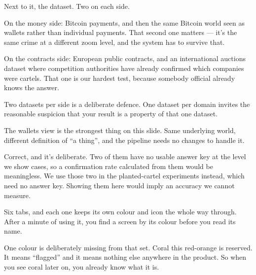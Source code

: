 \documentclass[11pt]{article}
\begin{document}

\begin{saythis}
Next to it, the dataset. Two on each side.

On the money side: Bitcoin payments, and then the same Bitcoin world seen as
wallets rather than individual payments. That second one matters --- it's the
same crime at a different zoom level, and the system has to survive that.

On the contracts side: European public contracts, and an international auctions
dataset where competition authorities have already confirmed which companies
were cartels. That one is our hardest test, because somebody official already
knows the answer.
\end{saythis}

\begin{means}
Two datasets per side is a deliberate defence. One dataset per domain invites
the reasonable suspicion that your result is a property of that one dataset.

The wallets view is the strongest thing on this slide. Same underlying world,
different definition of ``a thing'', and the pipeline needs no changes to
handle it.
\end{means}

\begin{asked}
 Correct, and it's deliberate.
Two of them have no usable answer key at the level we show cases, so a
confirmation rate calculated from them would be meaningless. We use those two
in the planted-cartel experiments instead, which need no answer key. Showing
them here would imply an accuracy we cannot measure.
\end{asked}


\begin{saythis}
Six tabs, and each one keeps its own colour and icon the whole way through.
After a minute of using it, you find a screen by its colour before you read its
name.

One colour is deliberately missing from that set. Coral \bt this red-orange
\bt is reserved. It means ``flagged'' and it means nothing else anywhere in
the product. So when you see coral later on, you already know what it is.
\end{saythis}
\end{document}
